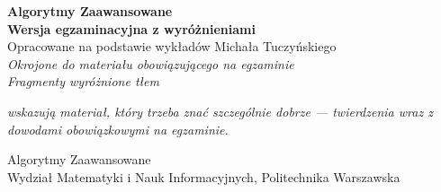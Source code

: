 




\begin{titlepage}
	\centering
	\vspace*{2cm}
	{\LARGE\bfseries\color{accent} Algorytmy Zaawansowane}\\[0.5cm]
	{\large\bfseries\color{accentB} Wersja egzaminacyjna z wyróżnieniami}\\[0.5cm]
	{\normalsize Opracowane na podstawie wykładów Michała Tuczyńskiego}\\[0.5cm]
	{\small\itshape Okrojone do materiału obowiązującego na egzaminie}\\[2cm]

	{\small\itshape Fragmenty wyróżnione tłem}\\
	\begin{obowiazkowy}
		\centering\small\itshape
		wskazują materiał, który trzeba znać szczególnie dobrze ---
		twierdzenia wraz z dowodami obowiązkowymi na egzaminie.
	\end{obowiazkowy}

	\vfill
	{\small Algorytmy Zaawansowane\\
		Wydział Matematyki i Nauk Informacyjnych, Politechnika Warszawska}
\end{titlepage}

\tableofcontents
\newpage















